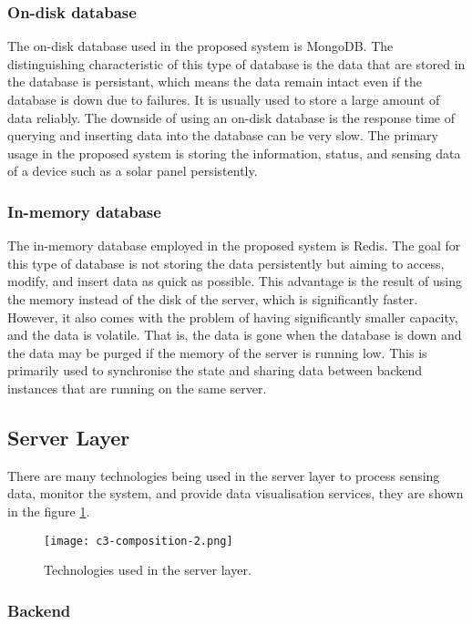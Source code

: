 \documentclass[../thesis.tex]{subfiles}
\begin{document}
\subsubsection{On-disk database}

The on-disk database used in the proposed system is MongoDB. The distinguishing characteristic of this type of database is the data that are stored in the database is persistant, which means the data remain intact even if the database is down due to failures. It is usually used to store a large amount of data reliably. The downside of using an on-disk database is the response time of querying and inserting data into the database can be very slow. The primary usage in the proposed system is storing the information, status, and sensing data of a device such as a solar panel persistently. 

\subsubsection{In-memory database}

The in-memory database employed in the proposed system is Redis. The goal for this type of database is not storing the data persistently but aiming to access, modify, and insert data as quick as possible. This advantage is the result of using the memory instead of the disk of the server, which is significantly faster. However, it also comes with the problem of having significantly smaller capacity, and the data is volatile. That is, the data is gone when the database is down and the data may be purged if the memory of the server is running low. This is primarily used to synchronise the state and sharing data between backend instances that are running on the same server. 

\subsection{Server Layer}

There are many technologies being used in the server layer to process sensing data, monitor the system, and provide data visualisation services, they are shown in the figure \ref{fig:composition2}.

\begin{figure}[!ht]
  \texttt{[image: c3-composition-2.png]}
  \caption{Technologies used in the server layer.}
  \label{fig:composition2}
\end{figure}


\subsubsection{Backend}
\end{document}
